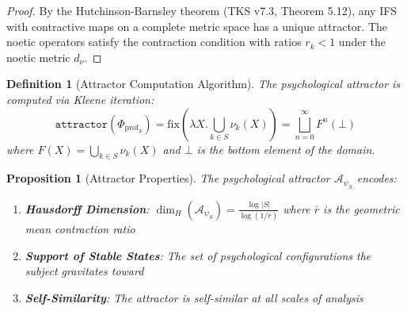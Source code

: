 \documentclass[11pt,twoside]{book}
\newcommand{\noe}[1]{\nu_{#1}}
\newcommand{\HausdorffDim}{\dim_H}
\newcommand{\fix}{\mathrm{fix}}
\newcommand{\PsychAttractor}{\mathcal{A}_\psi}
\newcommand{\ProfileFrac}{\Phi_{\mathrm{prof}}}
\newtheorem{definition}{Definition}[chapter]
\newtheorem{proposition}{Proposition}[chapter]
\begin{document}
\begin{proof}
By the Hutchinson-Barnsley theorem (TKS v7.3, Theorem 5.12), any IFS with contractive
maps on a complete metric space has a unique attractor. The noetic operators satisfy
the contraction condition with ratios $r_k < 1$ under the noetic metric $d_\nu$.
\end{proof}

\begin{definition}[Attractor Computation Algorithm]
\label{def:attractor-algorithm}
The psychological attractor is computed via Kleene iteration:
\begin{equation}
\boxed{
    \texttt{attractor}(\ProfileFrac_S) = \fix\left(\lambda X. \bigcup_{k \in S} \noe{k}(X)\right)
    = \bigsqcup_{n=0}^{\infty} F^n(\bot)
}
\end{equation}
where $F(X) = \bigcup_{k \in S} \noe{k}(X)$ and $\bot$ is the bottom element of the domain.
\end{definition}

\begin{proposition}[Attractor Properties]
\label{prop:attractor-properties}
The psychological attractor $\PsychAttractor_S$ encodes:
\begin{enumerate}[label=(\roman*)]
    \item \textbf{Hausdorff Dimension}: $\HausdorffDim(\PsychAttractor_S) = \frac{\log|S|}{\log(1/\bar{r})}$
          where $\bar{r}$ is the geometric mean contraction ratio
    \item \textbf{Support of Stable States}: The set of psychological configurations the
          subject gravitates toward
    \item \textbf{Self-Similarity}: The attractor is self-similar at all scales of analysis
\end{enumerate}
\end{proposition}
\end{document}
